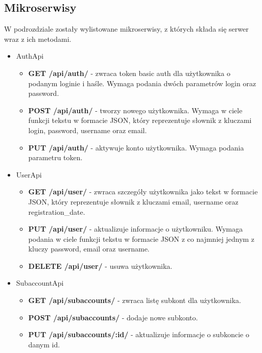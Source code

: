 \documentclass{article}
\begin{document}
	\subsection{Mikroserwisy}
	W podrozdziale zostały wylistowane mikroserwisy, z których składa się serwer wraz z ich
	metodami.
	\begin{itemize}
		\item AuthApi
			\begin{itemize}
				\item \textbf{GET /api/auth/} - zwraca token basic auth dla użytkownika o podanym loginie i haśle. Wymaga podania dwóch parametrów login oraz password.

				\item \textbf{POST /api/auth/} - tworzy nowego użytkownika. Wymaga w ciele funkcji tekstu w formacie JSON, który reprezentuje słownik z kluczami login, password, username oraz email.

				\item \textbf{PUT /api/auth/} - aktywuje konto użytkownika. Wymaga podania parametru token.
			\end{itemize}
		\item UserApi
			\begin{itemize}

				\item \textbf{GET /api/user/} - zwraca szczegóły użytkownika jako tekst w formacie JSON, który reprezentuje słownik z kluczami email, username oraz registration\_date.

				\item \textbf{PUT /api/user/} - aktualizuje informacje o użytkowniku. Wymaga podania w ciele funkcji tekstu w formacie JSON z co najmniej jednym z kluczy password, email oraz username.

				\item \textbf{DELETE /api/user/} - usuwa użytkownika.

			\end{itemize}
		\item SubaccountApi
			\begin{itemize}
				\item \textbf{GET /api/subaccounts/} - zwraca listę subkont dla użytkownika.

				\item \textbf{POST /api/subaccounts/} - dodaje nowe subkonto.

				\item \textbf{PUT /api/subaccounts/:id/} - aktualizuje informacje o subkoncie o danym id.


\end{itemize}
\end{itemize}
\end{document}
